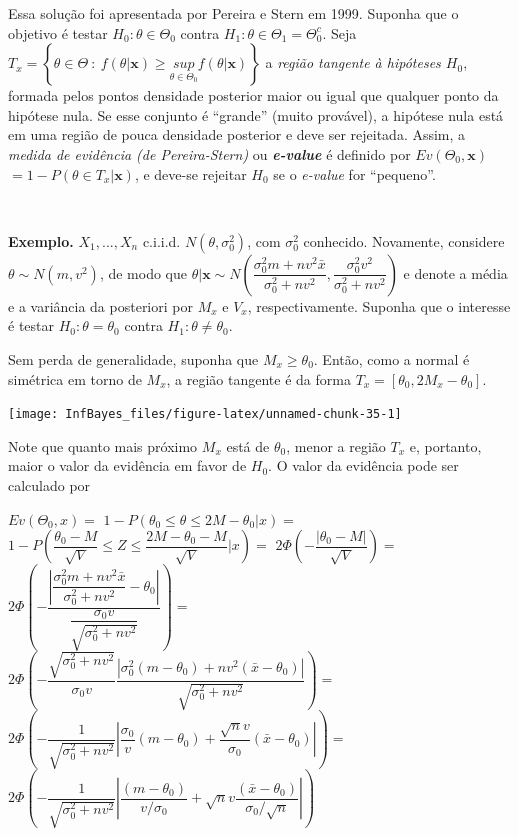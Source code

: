 \documentclass[
]{book}
\begin{document}
Essa solução foi apresentada por Pereira e Stern em 1999. Suponha que o objetivo é testar \(H_0:\theta\in\Theta_0\) contra \(H_1:\theta \in \Theta_1=\Theta_0^c\). Seja \(T_x=\left\{\theta\in\Theta ~:~f(\theta|\boldsymbol x)\geq \underset{\theta\in\Theta_0}{sup}f(\theta|\boldsymbol x)\right\}\) a \emph{região tangente à hipóteses \(H_0\)}, formada pelos pontos densidade posterior maior ou igual que qualquer ponto da hipótese nula. Se esse conjunto é ``grande'' (muito provável), a hipótese nula está em uma região de pouca densidade posterior e deve ser rejeitada. Assim, a \emph{medida de evidência (de Pereira-Stern)} ou \textbf{\emph{e-value}} é definido por \(Ev(\Theta_0,\boldsymbol x)\) \(=1-P\left(\theta\in T_x \big|\boldsymbol x \right)\), e deve-se rejeitar \(H_0\) se o \emph{e-value} for ``pequeno''.

\(~\)

\textbf{Exemplo.} \(X_1,...,X_n\) c.i.i.d. \(N(\theta,{\sigma}_0^2)\), com \({\sigma}_0^2\) conhecido. Novamente, considere \(\theta\sim N(m,v^2)\), de modo que \(\theta|\boldsymbol x \sim N\left(\dfrac{{\sigma}_0^2m+nv^2\bar{x}}{{\sigma}_0^2+nv^2},\dfrac{{\sigma}_0^2v^2}{{\sigma}_0^2+nv^2}\right)\) e denote a média e a variância da posteriori por \(M_x\) e \(V_x\), respectivamente. Suponha que o interesse é testar \(H_0:\theta=\theta_0\) contra \(H_1:\theta\neq\theta_0\).

Sem perda de generalidade, suponha que \(M_x \geq \theta_0\). Então, como a normal é simétrica em torno de \(M_x\), a região tangente é da forma \(T_x=[\theta_0,2M_x-\theta_0]\).

\begin{center}\texttt{[image: InfBayes\_files/figure-latex/unnamed-chunk-35-1]} \end{center}

Note que quanto mais próximo \(M_x\) está de \(\theta_0\), menor a região \(T_x\) e, portanto, maior o valor da evidência em favor de \(H_0\). O valor da evidência pode ser calculado por

\(Ev(\Theta_0,x)=\) \(1-P\left(\theta_0\leq \theta\leq2M-\theta_0|x\right)=\) \(1-P\left(\dfrac{\theta_0-M}{\sqrt V}\leq Z\leq \dfrac{2M-\theta_0-M}{\sqrt V}|x\right)=\) \(2\Phi\left(-\dfrac{|\theta_0-M|}{\sqrt V}\right)=\) \(2\Phi\left(-\dfrac{\left|\dfrac{{\sigma}_0^2m+nv^2\bar{x}}{{\sigma}_0^2+nv^2}-\theta_0\right|}{\dfrac{{\sigma}_0 v}{\sqrt{{\sigma}_0^2+nv^2}}}\right)=\) \(2\Phi\left(-\dfrac{\sqrt{{\sigma}_0^2+nv^2}}{{\sigma}_0 v}\dfrac{|{\sigma}_0^2(m-\theta_0)+nv^2(\bar x-\theta_0)|}{\sqrt{{\sigma}_0^2+nv^2}}\right)=\) \(2\Phi\left(-\dfrac{1}{\sqrt{{\sigma}_0^2+nv^2}}\left|\dfrac{{\sigma}_0}{v}(m-\theta_0)+\dfrac{\sqrt n v}{{\sigma}_0}(\bar x-\theta_0)\right|\right)=\) \(2\Phi\left(-\dfrac{1}{\sqrt{{\sigma}_0^2+nv^2}}\left|\dfrac{(m-\theta_0)}{v/{\sigma}_0}+\sqrt nv\dfrac{(\bar x-\theta_0)}{{\sigma}_0/\sqrt n}\right|\right)\)
\end{document}
